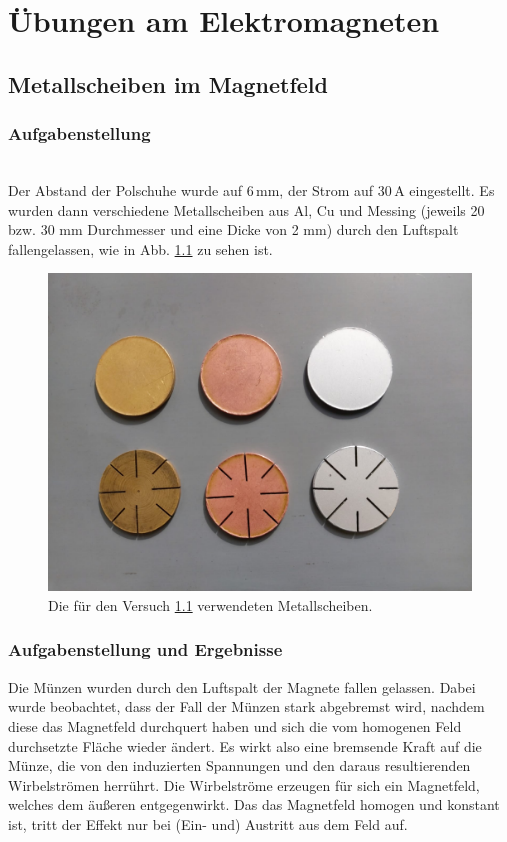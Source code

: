\documentclass[a4paper,twoside,12pt,DIV=13,BCOR=5mm,numbers=noenddot,cleardoublepage=empty]{scrbook}
\begin{document}
\chapter{Übungen am Elektromagneten}
\section{Metallscheiben im Magnetfeld}
\label{Metallscheiben im Magnetfeld}
\subsection{Aufgabenstellung}
\noindent\\
Der Abstand der Polschuhe wurde auf 6\,mm, der Strom auf 30\,A eingestellt.
Es wurden dann verschiedene Metallscheiben aus Al, Cu und Messing (jeweils 20 bzw. 30 mm Durchmesser und eine Dicke von 2 mm) durch den Luftspalt fallengelassen, wie in Abb. \ref{fig: Metallscheiben} zu sehen ist.

\begin{figure}
    \centering
    \includegraphics[scale=0.4]{pictures/Metallscheiben.pdf}
    \caption{Die für den Versuch \ref{Metallscheiben im Magnetfeld} verwendeten Metallscheiben.}
    \label{fig: Metallscheiben}
\end{figure}
\subsection{Aufgabenstellung und Ergebnisse}
Die Münzen wurden durch den Luftspalt der Magnete fallen gelassen. Dabei wurde beobachtet, dass der Fall der Münzen stark abgebremst wird, nachdem diese das Magnetfeld durchquert haben und sich die vom homogenen Feld durchsetzte Fläche wieder ändert. Es wirkt also eine bremsende Kraft auf die Münze, die von den induzierten Spannungen und den daraus resultierenden Wirbelströmen herrührt. Die Wirbelströme erzeugen für sich ein Magnetfeld, welches dem äußeren entgegenwirkt. Das das Magnetfeld homogen und konstant ist, tritt der Effekt nur bei (Ein- und) Austritt aus dem Feld auf. 
\end{document}
